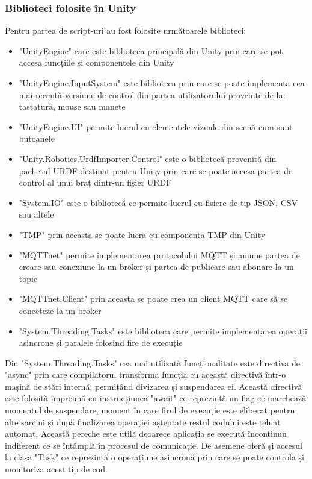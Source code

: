 \subsubsection{Biblioteci folosite în Unity}
Pentru partea de script-uri au fost folosite următoarele biblioteci:
\begin{itemize}
	\item "UnityEngine" care este biblioteca principală din Unity prin care se pot accesa funcțiile și componentele din Unity
	\item "UnityEngine.InputSystem" este biblioteca prin care se poate implementa cea mai recentă versiune de control din partea utilizatorului provenite de la: tastatură, mouse sau manete
	\item "UnityEngine.UI" permite lucrul cu elementele vizuale din scenă cum sunt butoanele 
	\item "Unity.Robotics.UrdfImporter.Control" este o bibliotecă provenită din pachetul URDF destinat pentru Unity prin care se poate accesa partea de control al unui braț dintr-un fișier URDF
	\item "System.IO" este o bibliotecă ce permite lucrul cu fișiere de tip JSON, CSV sau altele
	\item "TMP" prin aceasta se poate lucra cu componenta TMP din Unity
	\item "MQTTnet" permite implementarea protocolului MQTT și anume partea de creare sau conexiune la un broker și partea de publicare sau abonare la un topic
	\item "MQTTnet.Client" prin aceasta se poate crea un client MQTT care să se conecteze la un broker 
	\item "System.Threading.Tasks" este biblioteca care permite implementarea  operații asincrone și paralele folosind fire de execuție
\end{itemize}

Din "System.Threading.Tasks" cea mai utilizată funcționalitate este directiva de "async" prin care compilatorul transforma funcția cu această directivă într-o mașină de stări internă, permițând divizarea și suspendarea ei. Această directivă este folosită împreună cu instrucțiunea "await" ce reprezintă un flag ce marchează momentul de suspendare, moment în care firul de execuție este eliberat pentru alte sarcini și după finalizarea operației așteptate restul codului este reluat automat. Această pereche este utilă deoarece aplicația se execută încontinuu indiferent ce se întâmplă în procesul de comunicație. De asemene oferă și accesul la clasa "Task" ce reprezintă o operațiune asincronă prin care se poate controla și monitoriza acest tip de cod.

